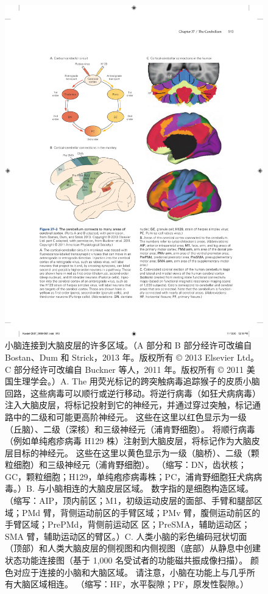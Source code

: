 \begin{figure}[htbp]
	\centering
	\includegraphics[width=0.9\linewidth]{chap37/fig_37_3}
	\caption{小脑连接到大脑皮层的许多区域。（A 部分和 B 部分经许可改编自 Bostan、Dum 和 Strick，2013 年。版权所有 © 2013 Elsevier Ltd。C 部分经许可改编自 Buckner 等人，2011 年。版权所有 © 2011 美国生理学会。）A. The 用荧光标记的跨突触病毒追踪猴子的皮质小脑回路，这些病毒可以顺行或逆行移动。将逆行病毒（如狂犬病病毒）注入大脑皮层，将标记投射到它的神经元，并通过穿过突触，标记通路中的二级和可能更高阶神经元。 这些在这里以红色显示为一级（丘脑）、二级（深核）和三级神经元（浦肯野细胞）。 将顺行病毒（例如单纯疱疹病毒 H129 株）注射到大脑皮层，将标记作为大脑皮层目标的神经元。 这些在这里以黄色显示为一级（脑桥）、二级（颗粒细胞）和三级神经元（浦肯野细胞）。 （缩写：DN，齿状核；GC，颗粒细胞；H129，单纯疱疹病毒株；PC，浦肯野细胞狂犬病病毒。）B. 与小脑相连的大脑皮层区域。 数字指的是细胞构造区域。 （缩写：AIP，顶内前区；M1，初级运动皮层的面部、手臂和腿部区域；PMd 臂，背侧运动前区的手臂区域；PMv 臂，腹侧运动前区的手臂区域；PrePMd，背侧前运动区 区；PreSMA，辅助运动区；SMA 臂，辅助运动区的臂区。）C. 人类小脑的彩色编码冠状切面（顶部）和人类大脑皮层的侧视图和内侧视图（底部）从静息中创建 状态功能连接图（基于 1,000 名受试者的功能磁共振成像扫描）。 颜色对应于连接的小脑和大脑区域。 请注意，小脑在功能上与几乎所有大脑区域相连。 （缩写：HF，水平裂隙；PF，原发性裂隙。）}
	\label{fig:37_3}
\end{figure}



